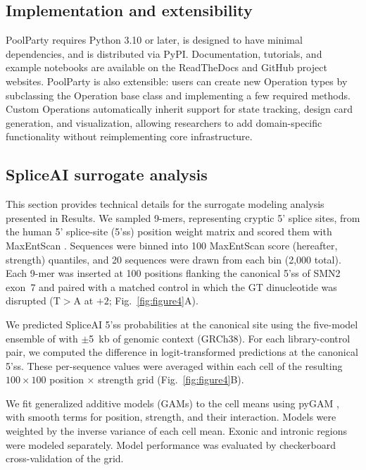 \documentclass[twoside]{kinney_lab_preprintstyle}
\begin{document}
\subsection{Implementation and extensibility}

PoolParty requires Python 3.10 or later, is designed to have minimal dependencies, and is distributed via PyPI. Documentation, tutorials, and example notebooks are available on the ReadTheDocs and GitHub project websites. PoolParty is also extensible: users can create new Operation types by subclassing the Operation base class and implementing a few required methods. Custom Operations automatically inherit support for state tracking, design card generation, and visualization, allowing researchers to add domain-specific functionality without reimplementing core infrastructure.

\subsection{SpliceAI surrogate analysis}

This section provides technical details for the surrogate modeling analysis presented in Results. We sampled 9-mers, representing cryptic 5' splice sites, from the human 5' splice-site (5'ss) position weight matrix \citep{Wong2018quantitative} and scored them with MaxEntScan \citep{Yeo2004me}. Sequences were binned into 100 MaxEntScan score (hereafter, strength) quantiles, and 20 sequences were drawn from each bin (2,000 total). Each 9-mer was inserted at 100 positions flanking the canonical 5'ss of SMN2 exon~7 and paired with a matched control in which the GT dinucleotide was disrupted (T$>$A at $+2$; Fig.~\ref{fig:figure4}A).

We predicted SpliceAI 5'ss probabilities at the canonical site using the five-model ensemble of \citet{Jaganathan2019ps} with $\pm$5~kb of genomic context (GRCh38). For each library-control pair, we computed the difference in logit-transformed predictions at the canonical 5'ss. These per-sequence values were averaged within each cell of the resulting $100 \times 100$ position $\times$ strength grid (Fig.~\ref{fig:figure4}B).

We fit generalized additive models (GAMs) to the cell means using pyGAM \citep{Serven2018pg}, with smooth terms for position, strength, and their interaction. Models were weighted by the inverse variance of each cell mean. Exonic and intronic regions were modeled separately. Model performance was evaluated by checkerboard cross-validation of the grid.
\end{document}
